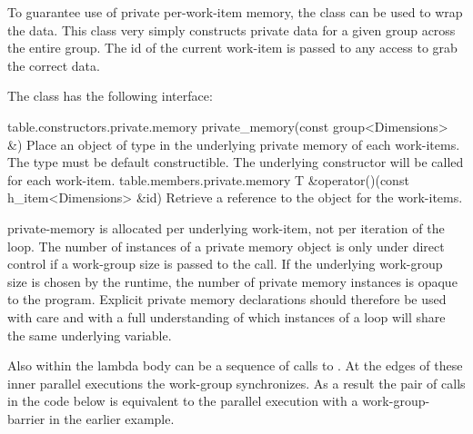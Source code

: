 To guarantee use of private per-work-item memory, the
 class can be used to wrap the data.
This class very simply constructs private data for a given group across the
entire group. The id of the current work-item is passed to any access
to grab the correct data.

The  class has the following interface:
\label{paragraph.private.memory}

{table.constructors.private.memory}
  \addRow
    {private_memory(const group<Dimensions> \&)}
    {
      Place an object of type  in the underlying private memory of each \glspl{work-item}.
      The type  must be default constructible.
      The underlying constructor will be called for each \gls{work-item}.
    }
\completeTable
{table.members.private.memory}
  \addRow
    {T \&operator()(const h_item<Dimensions> \&id)}
    {
      Retrieve a reference to the object for the \glspl{work-item}.
    }
\completeTable

\Gls{private-memory} is allocated per underlying \gls{work-item}, not per
iteration of the  loop. The number
of instances of a private memory object is only under direct control
if a work-group size is passed to the
 call. If the underlying
work-group size is chosen by the runtime, the number of private memory
instances is opaque to the program. Explicit private memory
declarations should therefore be used with care and with a full
understanding of which instances of a
 loop will share the same
underlying variable.

Also within the lambda body can be a sequence of calls to
. At the edges of these inner
parallel executions the work-group synchronizes. As a result the pair
of  calls in the code below is
equivalent to the parallel execution with a \gls{work-group-barrier} in the earlier example.



